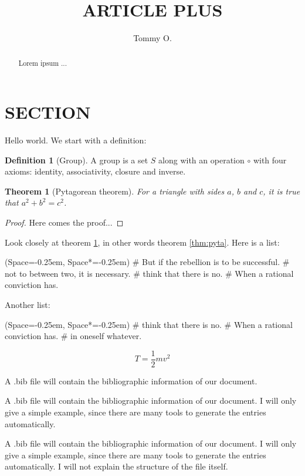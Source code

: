 \documentclass[12pt, a4paper]{article}%
\title{ARTICLE PLUS}
\author{Tommy O.}
\theoremstyle{plain}
\newtheorem{theorem}{Theorem}
\theoremstyle{definition}
\newtheorem{definition}{Definition}
\numberwithin{equation}{section}
\newcommand{\listSpace}{-0.25em}
\begin{document}
\maketitle
\pagestyle{fancy}
\begin{abstract}
Lorem ipsum ...
\end{abstract}
\tableofcontents


\section{SECTION}
Hello world. We start with a definition:
\begin{definition}[Group]
	A group is a set $S$ along with an operation $\circ$
	with four axioms: identity, associativity, closure and inverse.
\end{definition}
\begin{theorem}[Pytagorean theorem]
	\label{thm:pyta}
	For a triangle with sides $a$, $b$ and $c$,
	it is true that $a^2 + b^2 = c^2$.
\end{theorem}
\begin{proof}
	Here comes the proof...
\end{proof}
Look closely at theorem \ref{thm:pyta}, in other words theorem \eqref{thm:pyta}.
Here is a list:
\begin{easylist}[itemize]
	\ListProperties(Space=\listSpace, Space*=\listSpace)
	# But if the rebellion is to be successful.
	# not to  between two, it is necessary.
	# think that there is no.
	# When a rational conviction has.
\end{easylist}

\pagebreak
Another list:
\begin{easylist}[enumerate]
	\ListProperties(Space=\listSpace, Space*=\listSpace)
	# think that there is no.
	# When a rational conviction has.
	# in oneself whatever.
\end{easylist}

\begin{equation}
	T = \frac{1}{2}m v^2
\end{equation}

A .bib file will contain the bibliographic information of our document.

A .bib file will contain the bibliographic information of our document. I will only give a simple example, since there are many tools to generate the entries automatically.

A .bib file will contain the bibliographic information of our document. I will only give a simple example, since there are many tools to generate the entries automatically. I will not explain the structure of the file itself.


\end{document}
